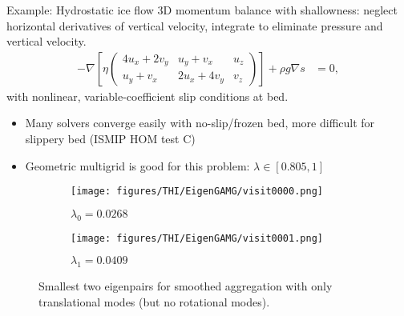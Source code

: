 \documentclass[final,t]{beamer}
\begin{document}
\begin{frame}[fragile]{}
\begin{columns}
    \begin{column}{0.49\textwidth}
      \begin{block}{Example: Hydrostatic ice flow}
        3D momentum balance with shallowness: neglect horizontal derivatives of vertical velocity, integrate to eliminate pressure and vertical velocity.
        \begin{align}\label{eq:momentum}
          - \nabla \left[ \eta
            \begin{pmatrix}
              4 u_x + 2 v_y & u_y + v_x & u_z \\
              u_y + v_x & 2 u_x + 4 v_y & v_z
            \end{pmatrix} \right] + \rho g \nabla s & = 0,
        \end{align}
        with nonlinear, variable-coefficient slip conditions at bed.
        \begin{itemize}
        \item Many solvers converge easily with no-slip/frozen bed, more difficult for slippery bed (ISMIP HOM test C)
        \item Geometric multigrid is good for this problem: $\lambda \in [0.805, 1]$~\cite{brown2013tmeice}
        \end{itemize}
        \begin{figure}
          \centering
          \begin{subfigure}{0.49\textwidth}
            \centering
            \texttt{[image: figures/THI/EigenGAMG/visit0000.png]}
            \caption{$\lambda_0 = 0.0268$}
          \end{subfigure}
          \begin{subfigure}{0.49\textwidth}
            \centering
            \texttt{[image: figures/THI/EigenGAMG/visit0001.png]}
            \caption{$\lambda_1 = 0.0409$}
          \end{subfigure}
          \caption{Smallest two eigenpairs for smoothed aggregation with only translational modes (but no rotational modes).}
        \end{figure}


\end{block}
\end{column}
\end{columns}
\end{frame}
\end{document}
